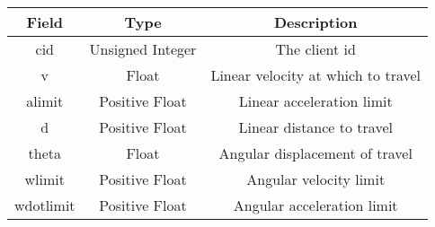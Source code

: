 \documentclass[letterpaper,10pt]{article}
\begin{document}
      \begin{tabular}{ccc}
	\textbf{Field} & \textbf{Type} & \textbf{Description}\\\hline
	cid & Unsigned Integer & The client id\\
	v & Float & Linear velocity at which to travel\\
	alimit & Positive Float & Linear acceleration limit\\
	d & Positive Float & Linear distance to travel\\
	theta & Float & Angular displacement of travel\\
	wlimit & Positive Float & Angular velocity limit\\
	wdotlimit & Positive Float & Angular acceleration limit\\
      \end{tabular}
      
      
\end{document}
